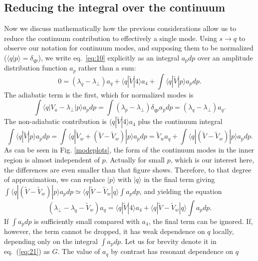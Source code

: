 \documentclass[12pt]{article}
\def\ket#1{|#1\rangle}
\def\bra#1{\langle#1}
\begin{document}
\subsection{Reducing the integral over the continuum}
\label{reducing}
Now we discuss mathematically how the previous considerations allow us
to reduce the continuum contribution to effectively a single mode.
Using $s\to q$ to observe our notation for continuum modes, and
supposing them to be normalized ($\bra{q}\ket{p}=\delta_{qp}$), we
write eq.\ \ref{eq:10} explicitly as an integral $a_pdp$ over an
amplitude distribution function $a_p$ rather than a sum:
\begin{equation}
  \label{continw}
  0=(\lambda_q-\lambda_\perp)a_q+\bra{q}|\tilde{V}\ket{4}a_4
  +\int\bra{q}|\tilde{V}\ket{p}a_pdp.
\end{equation}
The adiabatic term is the first, which for normalized modes is
\begin{equation}
  \label{eq:contadiab}
  \int\bra{q}|V_a-\lambda_\perp\ket{p}a_pdp = \int
  (\lambda_p-\lambda_\perp)\delta_{qp}a_pdp = (\lambda_q-\lambda_\perp)a_q.
\end{equation}
The non-adiabatic contribution is $\bra{q}|\tilde{V}\ket{4}a_4$ plus the
continuum integral
\begin{equation}
  \label{eq:18}
  \int \bra{q}|\tilde{V}\ket{p}a_pdp=\int\bra{q}|\tilde{V}_{w}+(\tilde{V}-\tilde{V}_{w})\ket{p}a_pdp
  =\tilde{V}_{w}a_q +\int\bra{q}|(\tilde{V}-\tilde{V}_{w})\ket{p}a_pdp.
\end{equation}
As can be seen in Fig. \ref{modeplots}, the form of the continuum
modes in the inner region is almost independent of $p$. Actually for
small $p$, which is our interest here, the differences are even
smaller than that figure shows. Therefore, to that degree of
approximation, we can replace $\ket{p}$ with $\ket{q}$ in the final
term giving $\int\bra{q}|(\tilde{V}-\tilde{V}_{w})\ket{p}a_pdp\simeq
\bra{q}|\tilde{V}-\tilde{V}_{w}\ket{q}\int a_pdp$, and yielding the
equation
\begin{equation}
  \label{eq:21}
  (\lambda_\perp-\lambda_q-\tilde V_w)a_q= \bra{q}|\tilde{V}\ket{4}a_4
  +\bra{q}|\tilde{V}-\tilde{V}_{w}\ket{q}\int a_pdp.
\end{equation}
If $\int a_pdp$ is sufficiently small compared with $a_4$, the final
term can be ignored.  If, however, the term cannot be dropped, it has
weak dependence on $q$ locally, depending only on the integral
$\int a_pdp$. Let us for brevity denote it in eq.\ (\ref{eq:21}) as
$G$. The value of $a_q$ by contrast has resonant dependence on $q$
\end{document}
